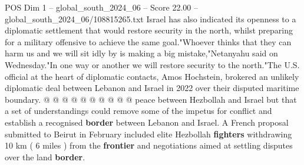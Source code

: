\begin{textsample}{POS Dim 1 – global\_south\_2024\_06 – Score 22.00 – global\_south\_2024\_06/108815265.txt}
Israel has also indicated its openness to a diplomatic settlement that would restore security in the north, whilst preparing for a military offensive to achieve the same goal."Whoever thinks that they can harm us and we will sit idly by is making a big mistake,"Netanyahu said on Wednesday."In one way or another we will restore security to the north."The U.S. official at the heart of diplomatic contacts, Amos Hochstein, brokered an unlikely diplomatic deal between Lebanon and Israel in 2022 over their disputed maritime boundary. @ @ @ @ @ @ @ @ @ @ peace between Hezbollah and Israel but that a set of understandings could remove some of the impetus for conflict and establish a recognised \textbf{border} between Lebanon and Israel.
A French proposal submitted to Beirut in February included elite Hezbollah \textbf{fighters} withdrawing 10 km ( 6 miles ) from the \textbf{frontier} and negotiations aimed at settling disputes over the land \textbf{border}.

\end{textsample}
